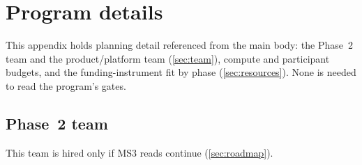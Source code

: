 \section{Program details}
\label{app:program}

This appendix holds planning detail referenced from the main body: the Phase~2 team and the
product/platform team (\cref{sec:team}), compute and participant budgets, and the
funding-instrument fit by phase (\cref{sec:resources}). None is needed to read the program's gates.

\subsection{Phase~2 team}

\evfut{} This team is hired only if MS3 reads continue (\cref{sec:roadmap}).

